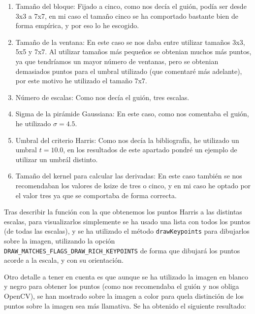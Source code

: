 \documentclass[12pt, spanish]{article}
\begin{document}
\begin{enumerate}
	\item Tamaño del bloque: Fijado a cinco, como nos decía el guión, podía ser desde 3x3 a 7x7, en mi caso el tamaño cinco se ha comportado bastante bien de forma empírica, y por eso lo he escogido.
	\item Tamaño de la ventana: En este caso se nos daba entre utilizar tamaños 3x3, 5x5 y 7x7. Al utilizar tamaños más pequeños se obtenian muchos más puntos, ya que tendríamos un mayor número de ventanas, pero se obtenian demasiados puntos para el umbral utilizado (que comentaré más adelante), por este motivo he utilizado el tamaño 7x7.
	\item Número de escalas: Como nos decía el guión, tres escalas.
	\item Sigma de la pirámide Gaussiana: En este caso, como nos comentaba el guión, he utilizado $\sigma = 4.5$.
	\item Umbral del criterio Harris: Como nos decía la bibliografía\cite{harris}, he utilizado un umbral $t = 10.0$, en los resultados de este apartado pondré un ejemplo de utilizar un umbrál distinto.
	\item Tamaño del kernel para calcular las derivadas: En este caso también se nos recomendaban los valores de ksize de tres o cinco, y en mi caso he optado por el valor tres ya que se comportaba de forma correcta.
\end{enumerate}

Tras describir la función con la que obtenemos los puntos Harris a las distintas escalas, para visualizarlos simplemente se ha usado una lista con todos los puntos (de todas las escalas), y se ha utilizado el método \texttt{drawKeypoints} para dibujarlos sobre la imagen, utilizando la opción\\  \texttt{DRAW\_MATCHES\_FLAGS\_DRAW\_RICH\_KEYPOINTS} de forma que dibujará los puntos acorde a la escala, y con su orientación.

Otro detalle a tener en cuenta es que aunque se ha utilizado la imagen en blanco y negro para obtener los puntos (como nos recomendaba el guión y nos obliga OpenCV), se han mostrado sobre la imagen a color para quela distinción de los puntos sobre la imagen sea más llamativa. Se ha obtenido el siguiente resultado:
\end{document}
